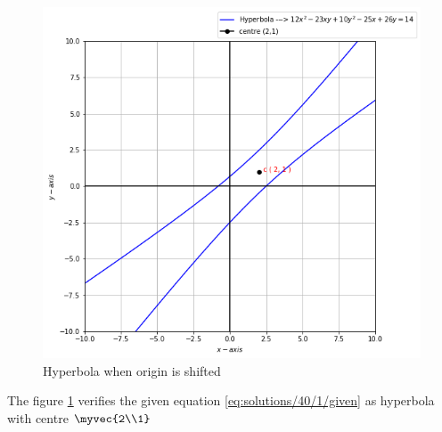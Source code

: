 \begin{figure}[h]
    \centering
    \includegraphics[width=\columnwidth]{Assignment 8.png}
    \caption{Hyperbola when origin is shifted}
    \label{eq:solutions/40/1/Fig :1}
\end{figure}

The figure \ref{eq:solutions/40/1/Fig :1} verifies the given equation \eqref{eq:solutions/40/1/given} as hyperbola with centre $\myvec{2\\1}$

